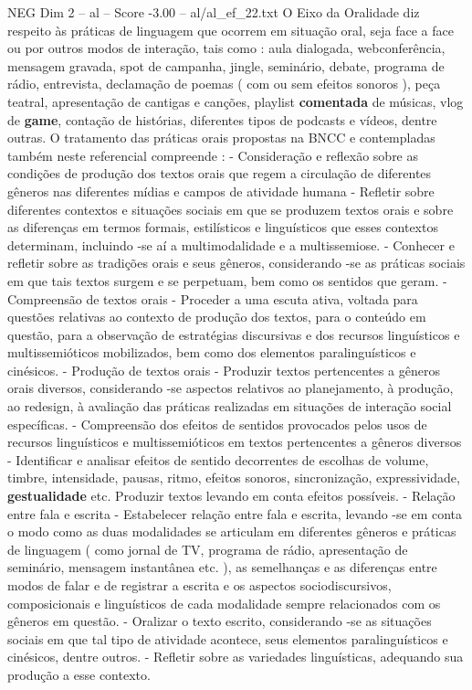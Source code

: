 \begin{textsample}{NEG Dim 2 – al – Score -3.00 – al/al\_ef\_22.txt}  \label{ex:f2_neg_024}
O Eixo da Oralidade diz respeito às práticas de linguagem que ocorrem em situação oral, seja face a face ou por outros modos de interação, tais como : aula dialogada, webconferência, mensagem gravada, spot de campanha, jingle, seminário, debate, programa de rádio, entrevista, declamação de poemas ( com ou sem efeitos sonoros ), peça teatral, apresentação de cantigas e canções, playlist \textbf{comentada} de músicas, vlog de \textbf{game}, contação de histórias, diferentes tipos de podcasts e vídeos, dentre outras.
O tratamento das práticas orais propostas na BNCC e contempladas também neste referencial compreende : - Consideração e reflexão sobre as condições de produção dos textos orais que regem a circulação de diferentes gêneros nas diferentes mídias e campos de atividade humana - Refletir sobre diferentes contextos e situações sociais em que se produzem textos orais e sobre as diferenças em termos formais, estilísticos e linguísticos que esses contextos determinam, incluindo -se aí a multimodalidade e a multissemiose. - Conhecer e refletir sobre as tradições orais e seus gêneros, considerando -se as práticas sociais em que tais textos surgem e se perpetuam, bem como os sentidos que geram. - Compreensão de textos orais - Proceder a uma escuta ativa, voltada para questões relativas ao contexto de produção dos textos, para o conteúdo em questão, para a observação de estratégias discursivas e dos recursos linguísticos e multissemióticos mobilizados, bem como dos elementos paralinguísticos e cinésicos. - Produção de textos orais - Produzir textos pertencentes a gêneros orais diversos, considerando -se aspectos relativos ao planejamento, à produção, ao redesign, à avaliação das práticas realizadas em situações de interação social específicas. - Compreensão dos efeitos de sentidos provocados pelos usos de recursos linguísticos e multissemióticos em textos pertencentes a gêneros diversos - Identificar e analisar efeitos de sentido decorrentes de escolhas de volume, timbre, intensidade, pausas, ritmo, efeitos sonoros, sincronização, expressividade, \textbf{gestualidade} etc.
Produzir textos levando em conta efeitos possíveis. - Relação entre fala e escrita - Estabelecer relação entre fala e escrita, levando -se em conta o modo como as duas modalidades se articulam em diferentes gêneros e práticas de linguagem ( como jornal de TV, programa de rádio, apresentação de seminário, mensagem instantânea etc. ), as semelhanças e as diferenças entre modos de falar e de registrar a escrita e os aspectos sociodiscursivos, composicionais e linguísticos de cada modalidade sempre relacionados com os gêneros em questão. - Oralizar o texto escrito, considerando -se as situações sociais em que tal tipo de atividade acontece, seus elementos paralinguísticos e cinésicos, dentre outros. - Refletir sobre as variedades linguísticas, adequando sua produção a esse contexto.

\end{textsample}
